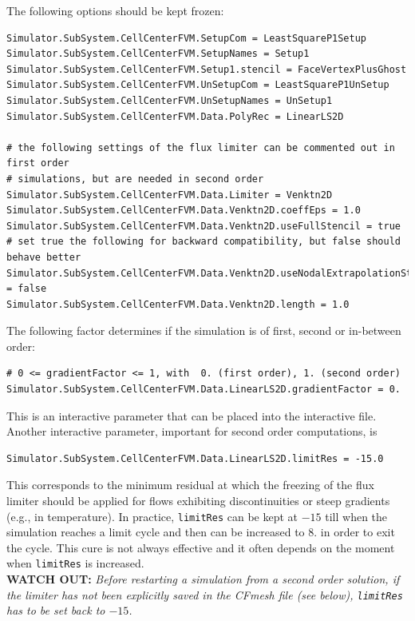 \documentclass[11pt]{article}
\begin{document}
The following options should be kept frozen:

\begin{verbatim}
Simulator.SubSystem.CellCenterFVM.SetupCom = LeastSquareP1Setup
Simulator.SubSystem.CellCenterFVM.SetupNames = Setup1
Simulator.SubSystem.CellCenterFVM.Setup1.stencil = FaceVertexPlusGhost
Simulator.SubSystem.CellCenterFVM.UnSetupCom = LeastSquareP1UnSetup
Simulator.SubSystem.CellCenterFVM.UnSetupNames = UnSetup1
Simulator.SubSystem.CellCenterFVM.Data.PolyRec = LinearLS2D

# the following settings of the flux limiter can be commented out in first order
# simulations, but are needed in second order
Simulator.SubSystem.CellCenterFVM.Data.Limiter = Venktn2D
Simulator.SubSystem.CellCenterFVM.Data.Venktn2D.coeffEps = 1.0
Simulator.SubSystem.CellCenterFVM.Data.Venktn2D.useFullStencil = true
# set true the following for backward compatibility, but false should behave better
Simulator.SubSystem.CellCenterFVM.Data.Venktn2D.useNodalExtrapolationStencil = false
Simulator.SubSystem.CellCenterFVM.Data.Venktn2D.length = 1.0
\end{verbatim}

The following factor determines if the simulation is of first, second or in-between order:
\begin{verbatim}
# 0 <= gradientFactor <= 1, with  0. (first order), 1. (second order)
Simulator.SubSystem.CellCenterFVM.Data.LinearLS2D.gradientFactor = 0.
\end{verbatim}
This is an interactive parameter that can be placed into the interactive file. Another interactive parameter,
important for second order computations, is 

\begin{verbatim}
Simulator.SubSystem.CellCenterFVM.Data.LinearLS2D.limitRes = -15.0
\end{verbatim}
This corresponds to the minimum residual at which the freezing of the flux limiter should be applied for flows exhibiting 
discontinuities or steep gradients (e.g., in temperature). In practice, {\tt limitRes} can be kept at  $-15$ till when 
the simulation reaches a limit cycle and then can be increased to $8.$ in order to exit the cycle. This cure is not 
always effective and it often depends on the moment when {\tt limitRes} is increased.\\
{\bf WATCH OUT:} {\it Before restarting a simulation from a second order solution, if the limiter has not been explicitly saved in the CFmesh file 
  (see below), {\tt limitRes} has to be set back to $-15$.}
\end{document}
